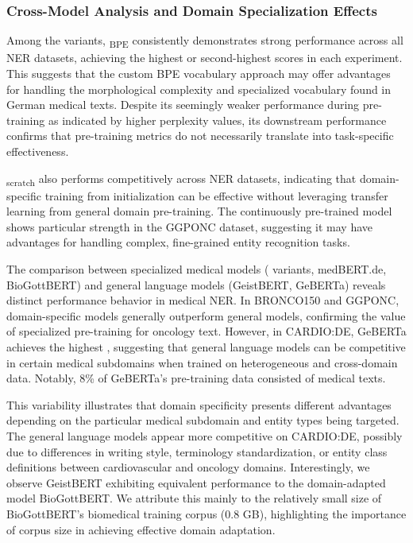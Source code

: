 \subsubsection{Cross-Model Analysis and Domain Specialization Effects}
Among the \ChristBERT{} variants, \ChristBERT\textsubscript{BPE} consistently
demonstrates strong performance across all NER datasets, achieving the highest
or second-highest \ff{} scores in each experiment. This suggests that the custom
BPE vocabulary approach may offer advantages for handling the morphological
complexity and specialized vocabulary found in German medical texts. Despite its
seemingly weaker performance during pre-training as indicated by higher
perplexity values, its downstream performance confirms that pre-training metrics
do not necessarily translate into task-specific effectiveness.

\ChristBERT\textsubscript{scratch} also performs competitively across NER
datasets, indicating that domain-specific training from initialization can be
effective without leveraging transfer learning from general domain pre-training.
The continuously pre-trained \ChristBERT{} model shows particular strength in
the GGPONC dataset, suggesting it may have advantages for handling complex,
fine-grained entity recognition tasks.

The comparison between specialized medical models (\ChristBERT{} variants,
medBERT.de, BioGottBERT) and general language models (GeistBERT, GeBERTa)
reveals distinct performance behavior in medical NER. In BRONCO150 and GGPONC,
domain-specific models generally outperform general models, confirming the value
of specialized pre-training for oncology text. However, in CARDIO:DE, GeBERTa
achieves the highest \ff, suggesting that general language models can be
competitive in certain medical subdomains when trained on heterogeneous and
cross-domain data. Notably, 8\% of GeBERTa’s pre-training data consisted of
medical texts. 

This variability illustrates that domain specificity presents different
advantages depending on the particular medical subdomain and entity types being
targeted. The general language models appear more competitive on CARDIO:DE,
possibly due to differences in writing style, terminology standardization, or
entity class definitions between cardiovascular and oncology domains.
Interestingly, we observe GeistBERT exhibiting equivalent performance to the
domain-adapted model BioGottBERT. We attribute this mainly to the relatively
small size of BioGottBERT's biomedical training corpus (0.8 GB), highlighting
the importance of corpus size in achieving effective domain adaptation.

